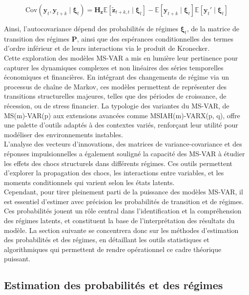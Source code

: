 \begin{sloppypar}
\[
\text{Cov}(\mathbf{y}_t, \mathbf{y}_{t+k} \mid \boldsymbol{\xi}_t) = \mathbf{H}_{\mathbf{z}} \mathbb{E}[\tilde{\mathbf{z}}_{t+k,t} \mid \boldsymbol{\xi}_t] - \mathbb{E}[\mathbf{y}_{t+k} \mid \boldsymbol{\xi}_t] \mathbb{E}[\mathbf{y}_t' \mid \boldsymbol{\xi}_t]
\]

Ainsi, l'autocovariance dépend des probabilités de régimes \(\boldsymbol{\xi}_t\), de la matrice de transition des régimes \(\mathbf{P}\), ainsi que des espérances conditionnelles des termes d'ordre inférieur et de leurs interactions via le produit de Kronecker.\\

Cette exploration des modèles MS-VAR a mis en lumière leur pertinence pour capturer les dynamiques complexes et non linéaires des séries temporelles économiques et financières. En intégrant des changements de régime via un processus de chaîne de Markov, ces modèles permettent de représenter des transitions structurelles majeures, telles que des périodes de croissance, de récession, ou de stress financier. La typologie des variantes du MS-VAR, de MS(m)-VAR(p) aux extensions avancées comme MSIAH(m)-VARX(p, q), offre une palette d’outils adaptés à des contextes variés, renforçant leur utilité pour modéliser des environnements instables.\\

L’analyse des vecteurs d’innovations, des matrices de variance-covariance et des réponses impulsionnelles a également souligné la capacité des MS-VAR à étudier les effets des chocs structurels dans différents régimes. Ces outils permettent d’explorer la propagation des chocs, les interactions entre variables, et les moments conditionnels qui varient selon les états latents.\\

Cependant, pour tirer pleinement parti de la puissance des modèles MS-VAR, il est essentiel d’estimer avec précision les probabilités de transition et de régimes. Ces probabilités jouent un rôle central dans l’identification et la compréhension des régimes latents, et constituent la base de l’interprétation des résultats du modèle. La section suivante se concentrera donc sur les méthodes d’estimation des probabilités et des régimes, en détaillant les outils statistiques et algorithmiques qui permettent de rendre opérationnel ce cadre théorique puissant.

\subsection{Estimation des probabilités et des régimes}


\end{sloppypar}
